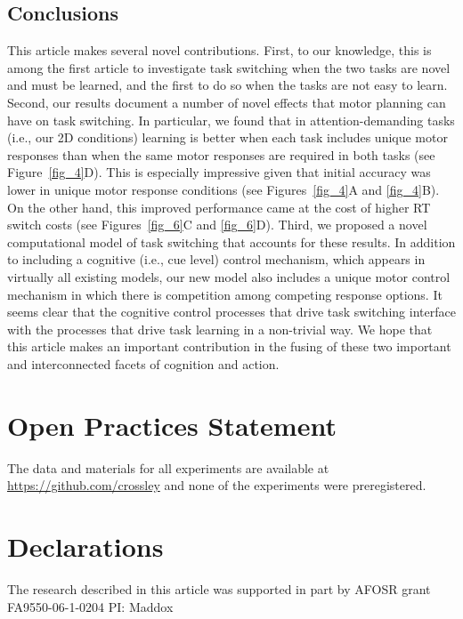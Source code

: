 \documentclass[doc, floatsintext]{apa7}
\begin{document}
\subsection{Conclusions}
This article makes several novel contributions. First, to
our knowledge, this is among the first article to
investigate task switching when the two tasks are novel and
must be learned, and the first to do so when the tasks are
not easy to learn.  Second, our results document a number of
novel effects that motor planning can have on task
switching. In particular, we found that in
attention-demanding tasks (i.e., our 2D conditions) learning
is better when each task includes unique motor responses
than when the same motor responses are required in both
tasks (see Figure~\ref{fig_4}D). This is especially
impressive given that initial accuracy was lower in unique
motor response conditions (see Figures~\ref{fig_4}A and
\ref{fig_4}B). On the other hand, this improved performance
came at the cost of higher RT switch costs (see
Figures~\ref{fig_6}C and \ref{fig_6}D).  Third, we proposed
a novel computational model of task switching that accounts
for these results. In addition to including a cognitive
(i.e., cue level) control mechanism, which appears in
virtually all existing models, our new model also includes a
unique motor control mechanism in which there is competition
among competing response options.  It seems clear that the
cognitive control processes that drive task switching
interface with the processes that drive task learning in a
non-trivial way. We hope that this article makes an
important contribution in the fusing of these two important
and interconnected facets of cognition and action.

\section{Open Practices Statement} 
The data and materials for all experiments are available at
\url{https://github.com/crossley} and none of the
experiments were preregistered.


\section{Declarations}
The research described in this article was supported in part
by AFOSR grant FA9550-06-1-0204 PI: Maddox
\end{document}
